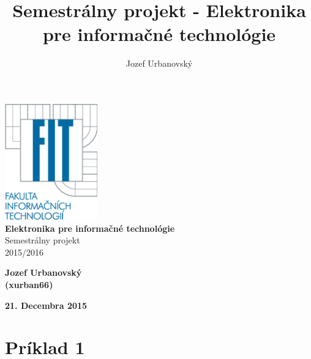 \documentclass[10pt,a4paper]{article}
\author{Jozef Urbanovský}
\title{Semestrálny projekt - Elektronika pre informačné technológie}
\begin{document}
\begin{titlepage}
	\begin{center}
	
        \includegraphics[clip, width=4.0cm]{FIT.png}\\
    	\vspace*{3.0cm}
    	\huge{\textbf{Elektronika pre informačné technológie}}\\
    	\vspace*{1.0cm}
    	\huge{Semestrálny projekt}
    	\vspace*{0.5cm}\\
    	2015/2016\\
    	\vspace*{8.0cm}
	\end{center}


	\begin{minipage}{0.32\textwidth}
		\begin{center}
    		\textbf{\large Jozef Urbanovský\\(xurban66)}\\
		\end{center}
	\end{minipage}
	\hfill
	\begin{minipage}{0.32\textwidth}
		\begin{center}
    		\textbf{\large 21. Decembra 2015}\\
		\end{center}
	\end{minipage}	

\end{titlepage}	


\begin{titlepage}
    \tableofcontents
\end{titlepage}




 \section {Príklad 1}
 
\end{document}
